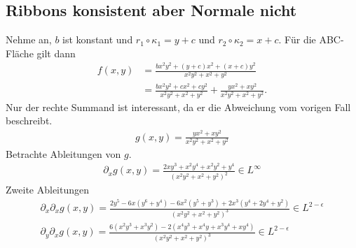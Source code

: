 \documentclass[10pt,a4paper]{report}
\begin{document}
\subsection{Ribbons konsistent aber Normale nicht}
Nehme an, $b$ ist konstant und $r_1 \circ \kappa_1 = y+c$ und $r_2 \circ \kappa_2 = x+c$.
Für die ABC-Fläche gilt dann
\begin{align*}
f \left(x, y\right) &= \frac{bx^2y^2 + \left(y+c\right)x^2 + \left(x+c\right)y^2}{x^2y^2+x^2+y^2} \\
&= \frac{bx^2y^2 + cx^2 + cy^2}{x^2y^2+x^2+y^2} + \frac{yx^2+xy^2}{x^2y^2+x^2+y^2}.
\end{align*}
Nur der rechte Summand ist interessant, da er die Abweichung vom vorigen Fall beschreibt.
\begin{align*}
g \left(x, y\right) = \frac{yx^2+xy^2}{x^2y^2+x^2+y^2}
\end{align*}
Betrachte Ableitungen von $g$.
\begin{align*}
\partial_x g \left(x, y\right) = \frac{2xy^3 + x^2y^4 + x^2y^2+y^4}{\left(x^2y^2+x^2+y^2\right)^2} \in L^{\infty}
\end{align*}
Zweite Ableitungen
\begin{align*}
\partial_x \partial_x g \left(x, y\right) = \frac{2y^5-6x \left(y^6+y^4\right)-6x^2\left(y^5+y^3\right)+2x^3\left(y^4+2y^4+y^2\right)}{\left(x^2y^2+x^2+y^2\right)^3} \in L^{2-\epsilon} \\
\partial_y \partial_x g \left(x, y\right) = \frac{6\left(x^2y^3+x^3y^2\right)-2\left(x^4y^3+x^4y+x^3y^4+xy^4\right)}{\left(x^2y^2+x^2+y^2\right)^3} \in L^{2-\epsilon}
\end{align*}
\end{document}
